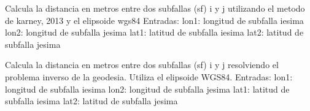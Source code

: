 \documentclass[letterpaper,10pt,english]{sphinxmanual}
\begin{document}

\begin{fulllineitems}
\label{\detokenize{main:main.dist_sf}}
\pysigstartsignatures
{}
\pysigstopsignatures
\sphinxAtStartPar
Calcula la distancia en metros entre dos subfallas (sf) i y j utilizando el metodo de karney, 2013 y el elipsoide wgs84
Entradas:
lon1: longitud de subfalla i\sphinxhyphen{}esima
lon2: longitud de subfalla j\sphinxhyphen{}esima
lat1: latitud de subfalla i\sphinxhyphen{}esima
lat2: latitud de subfalla j\sphinxhyphen{}esima

\end{fulllineitems}


\begin{fulllineitems}
\label{\detokenize{main:main.dist_sf_alt}}
\pysigstartsignatures
{}
\pysigstopsignatures
\sphinxAtStartPar
Calcula la distancia en metros entre dos subfallas (sf) i y j resolviendo el problema inverso 
de la geodesia. Utiliza el elipsoide WGS84. 
Entradas:
lon1: longitud de subfalla i\sphinxhyphen{}esima
lon2: longitud de subfalla j\sphinxhyphen{}esima
lat1: latitud de subfalla i\sphinxhyphen{}esima
lat2: latitud de subfalla j\sphinxhyphen{}esima

\end{fulllineitems}


\begin{fulllineitems}
\label{\detokenize{main:main.dist_sf_vectorized}}
\pysigstartsignatures
{}
\pysigstopsignatures
\end{fulllineitems}
\end{document}
